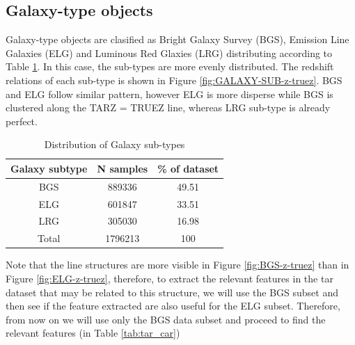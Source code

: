 \subsection{Galaxy-type objects}
Galaxy-type objects are clasified as Bright Galaxy Survey (BGS), Emission Line Galaxies (ELG) and Luminous Red Glaxies (LRG) distributing according to Table \ref{tab:Galaxy-sub-types}. In this case, the sub-types are more evenly distributed. The redshift relations of each sub-type is shown in Figure \ref{fig:GALAXY-SUB-z-truez}. BGS and ELG follow similar pattern, however ELG is more disperse while BGS is clustered along the TARZ = TRUEZ line, whereas LRG sub-type is already perfect. 
\begin{table}[!h]
\centering
\begin{tabular}{c|c|c}
	Galaxy subtype & N samples  & \% of dataset  \\ 
	\hline 
	BGS & 889336 & 49.51 \\ 	 
	ELG & 601847 & 33.51 \\  
	LRG & 305030 & 16.98 \\ 
	Total & 1796213 & 100 \\  
\end{tabular} 
\caption{Distribution of Galaxy sub-types}
\label{tab:Galaxy-sub-types}
\end{table}

Note that the line structures are more visible in Figure \ref{fig:BGS-z-truez} than in Figure \ref{fig:ELG-z-truez}, therefore, to extract the relevant features in the tar dataset that may be related to this structure, we will use the BGS subset and then see if the feature extracted are also useful for the ELG subset. Therefore, from now on we will use only the BGS data subset and proceed to find the relevant features (in Table \ref{tab:tar_car})

